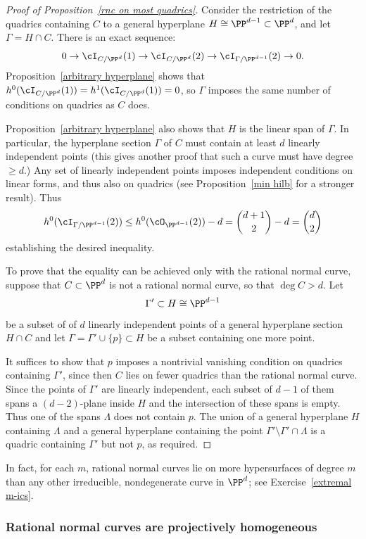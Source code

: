 \begin{proof}[Proof of Proposition~\ref{rnc on most quadrics}]
Consider the restriction of the quadrics containing $C$ to a general hyperplane $H \cong \PP^{d-1} \subset \PP^d$, and let $\Gamma = H \cap C$. There is an exact sequence:
$$
0 \to \cI_{C/\PP^d}(1) \to \cI_{C/\PP^d}(2) \to \cI_{\Gamma/\PP^{d-1}}(2) \to 0.
$$ 
Proposition~\ref{arbitrary hyperplane} shows that $h^0(\cI_{C/\PP^d}(1)) = h^1(\cI_{C/\PP^d}(1))=0$, so $\Gamma$
imposes the same number of conditions on quadrics as $C$ does.

Proposition~\ref{arbitrary hyperplane} also shows that $H$ is the linear span of  $\Gamma$. In particular, the hyperplane section $\Gamma$ of $C$ must contain at least $d$ linearly independent points (this gives another proof that
such a curve must have degree $\geq d$.)
Any set of linearly independent points imposes independent conditions on linear forms, and thus also on quadrics (see 
Proposition~\ref{min hilb} for a stronger result). Thus
$$
h^0(\cI_{\Gamma/\PP^{d-1}}(2)) \leq h^0(\cO_{\PP^{d-1}}(2)) - d = \binom{d+1}{2} - d = \binom{d}{2}
$$
establishing the desired inequality. 

To prove that the equality can be achieved only with the rational normal curve, suppose that $C\subset \PP^{d}$
is not a rational normal curve, so that $\deg C >d$. Let
$$
\Gamma' \subset H \cong \PP^{d-1}
$$
be a subset of of $d$ linearly independent points of a general hyperplane section $H\cap C$
and let $\Gamma = \Gamma'\cup\{p\}\subset H$ be a subset containing one more point.

It suffices to show that $p$ imposes a nontrivial vanishing condition on quadrics containing $\Gamma'$, since
then $C$ lies on fewer quadrics than the rational normal curve.
Since the points of $\Gamma'$ are linearly independent, each subset of $d-1$ of them spans a $(d-2)$-plane inside $H$ and the intersection of these spans is empty. Thus one of the spans $\Lambda$ does not contain $p$.
The union of  a general hyperplane $H$ containing $\Lambda$ and a general hyperplane containing 
the point $\Gamma' \setminus \Gamma'\cap \Lambda$
is a quadric containing $\Gamma'$ but not $p$, as required. 
\end{proof}

In fact, for each $m$, rational normal curves lie on more hypersurfaces of degree $m$ than any other irreducible, nondegenerate curve in $\PP^d$; see Exercise~\ref{extremal m-ics}. 

\subsubsection{Rational normal curves are projectively homogeneous}

